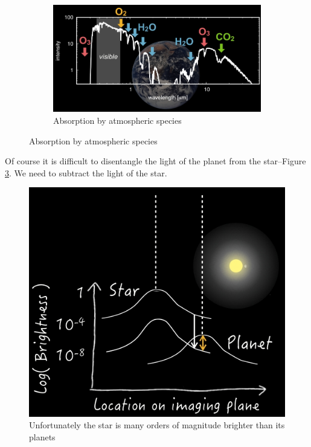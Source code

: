 \documentclass[]{article}
\begin{document}
\begin{figure}[H]
\begin{subfigure}[b]{0.45\textwidth}
	\end{subfigure}
	\begin{subfigure}[b]{0.45\textwidth}
		\caption{Absorption by atmospheric species}\label{fig:spectrum:earth:twin3}
		\includegraphics[width=\textwidth]{SpectrumEarthTwin3}
	\end{subfigure}
\end{figure}

Of course it is difficult to disentangle the light of the planet from the star--Figure \ref{fig:StarIsMuchBrighter}. We need to subtract the light of the star.

\begin{figure}[H]
	\caption{Unfortunately the star is many orders of magnitude brighter than its planets}\label{fig:StarIsMuchBrighter}
	\includegraphics[width=\textwidth]{StarIsMuchBrighter}
\end{figure}
\end{document}
